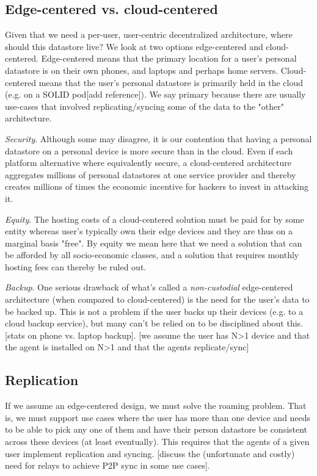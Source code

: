 \documentclass[11pt, oneside]{article}   	%
\begin{document}
\subsection{Edge-centered vs. cloud-centered}
Given that we need a per-user, user-centric decentralized architecture, where should this datastore live? We look at two options edge-centered and cloud-centered. Edge-centered means that the primary location for a user's personal datastore is on their own phones, and laptops and perhaps home servers. Cloud-centered means that the user's personal datastore is primarily held in the cloud (e.g. on a SOLID pod[add reference]). We say primary because there are usually use-cases that involved replicating/syncing some of the data to the "other" architecture. 

\emph{Security}. Although some may disagree, it is our contention that having a personal datastore on a personal device is more secure than in the cloud. Even if each platform alternative where equivalently secure, a cloud-centered architecture aggregates millions of personal datastores at one service provider and thereby creates millions of times the economic incentive for hackers to invest in attacking it. 

\emph{Equity}. The hosting costs of a cloud-centered solution must be paid for by some entity whereas user's typically own their edge devices and they are thus on a marginal basis "free". By equity we mean here that we need a solution that can be afforded by all socio-economic classes, and a solution that requires monthly hosting fees can thereby be ruled out. 

\emph{Backup}. One serious drawback of what's called a \emph{non-custodial} edge-centered architecture (when compared to cloud-centered) is the need for the user's data to be backed up. This is not a problem if the user backs up their devices (e.g. to a cloud backup service), but many can't be relied on to be disciplined about this. [stats on phone vs. laptop backup]. [we assume the user has N>1 device and that the agent is installed on N>1 and that the agents replicate/sync]

\subsection{Replication}

If we assume an edge-centered design, we must solve the roaming problem. That is, we must support use cases where the user has more than one device and needs to be able to pick any one of them and have their person datastore be consistent across these devices (at least eventually). This requires that the agents of a given user implement replication and syncing. [discuss the (unfortunate and costly) need for relays to achieve P2P sync in some use cases].
\end{document}

